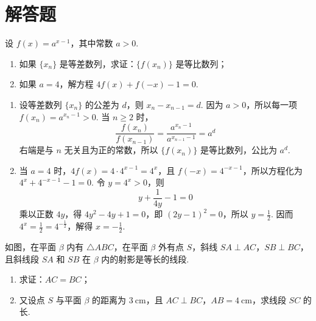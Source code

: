 \documentclass[UTF8,a4paper,oneside,11pt]{ctexbook}
\begin{document}
\section{解答题}

\begin{problem}

设 \(f(x) = a^{x - 1}\)，其中常数 \(a > 0\).

\begin{enumerate}
\item 如果 \(\{x_n\}\) 是等差数列，求证：\(\{f(x_n)\}\) 是等比数列；
\item 如果 \(a = 4\)，解方程 \(4f(x) + f(-x) - 1 = 0\).
\end{enumerate}
\end{problem}

\begin{solution}
\begin{enumerate}
\item 设等差数列 \(\{x_n\}\) 的公差为 \(d\)，则 \(x_n-x_{n-1}=d\). 因为 \(a>0\)，所以每一项 \(f(x_n)=a^{x_n-1}>0\). 当 \(n\geqslant2\) 时，
\[
\frac{f(x_n)}{f(x_{n-1})}=\frac{a^{x_n-1}}{a^{x_{n-1}-1}}=a^d
\]
右端是与 \(n\) 无关且为正的常数，所以 \(\{f(x_n)\}\) 是等比数列，公比为 \(a^d\).

\item 当 \(a=4\) 时，\(4f(x)=4\cdot4^{x-1}=4^x\)，且 \(f(-x)=4^{-x-1}\)，所以方程化为 \(4^x+4^{-x-1}-1=0\). 令 \(y=4^x>0\)，则
\[
y+\frac{1}{4y}-1=0
\]
乘以正数 \(4y\)，得 \(4y^2-4y+1=0\)，即 \((2y-1)^2=0\)，所以 \(y=\frac12\). 因而 \(4^x=\frac12=4^{-\frac{1}{2}}\)，解得 \(x=-\frac12\).
\end{enumerate}
\end{solution}

\begin{problem}

如图，在平面 \(\beta\) 内有 \(\triangle ABC\)，在平面 \(\beta\) 外有点 \(S\)，斜线 \(SA \perp AC\)，\(SB \perp BC\)，且斜线段 \(SA\) 和 \(SB\) 在 \(\beta\) 内的射影是等长的线段.

\begin{enumerate}
\item 求证：\(AC = BC\)；
\item 又设点 \(S\) 与平面 \(\beta\) 的距离为 \(3\mathrm{~cm}\)，且 \(AC \perp BC\)，\(AB = 4\mathrm{~cm}\)，求线段 \(SC\) 的长.
\end{enumerate}

\end{problem}
\end{document}
